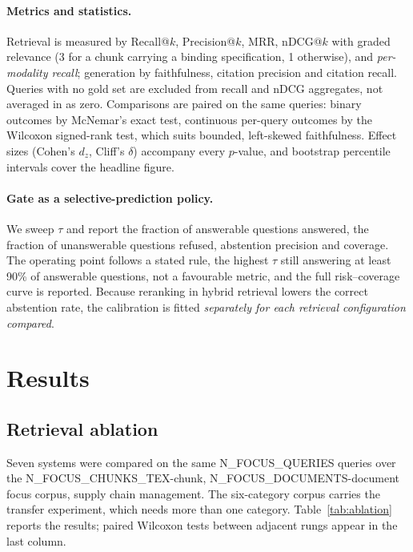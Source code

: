 \documentclass[conference]{IEEEtran}
\begin{document}
\paragraph{Metrics and statistics.} Retrieval is measured by Recall@$k$,
Precision@$k$, MRR, nDCG@$k$ with graded relevance
(3 for a chunk carrying a binding specification, 1 otherwise), and
\emph{per-modality recall}; generation by faithfulness, citation precision
and citation recall. Queries with no gold set are excluded from recall and
nDCG aggregates, not averaged in as zero. Comparisons are paired on the same
queries: binary outcomes by McNemar's exact test, continuous per-query
outcomes by the Wilcoxon signed-rank test, which suits bounded, left-skewed
faithfulness. Effect sizes (Cohen's $d_z$, Cliff's $\delta$) accompany every
$p$-value, and bootstrap percentile intervals cover the headline figure.

\paragraph{Gate as a selective-prediction policy.} We sweep $\tau$ and report
the fraction of answerable questions answered, the fraction of unanswerable
questions refused, abstention precision and coverage. The operating point
follows a stated rule, the highest $\tau$ still answering
at least 90\% of answerable questions, not a favourable metric, and the full
risk--coverage curve is reported. Because reranking in hybrid retrieval
lowers the correct abstention rate, the calibration is fitted
\emph{separately for each retrieval configuration compared}.

\section{Results}

\subsection{Retrieval ablation}

Seven systems were compared on the same {{N_FOCUS_QUERIES}} queries over the
{{N_FOCUS_CHUNKS_TEX}}-chunk, {{N_FOCUS_DOCUMENTS}}-document focus corpus,
supply chain management. The six-category corpus carries the transfer
experiment, which needs more than one category. Table~\ref{tab:ablation} reports
the results; paired Wilcoxon tests between adjacent rungs appear in the last
column.
\end{document}
